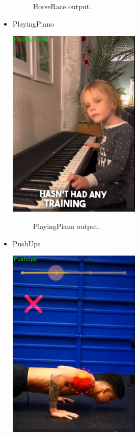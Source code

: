 \begin{itemize}
\begin{figure}[h!]
    	\caption[HorseRace output .]{HorseRace output.}
    	\label{race_lrcn.png} 
        \end{figure}

    \item PlayingPiano

        \includegraphics[width=0.5\textwidth]{Figures/piano_lrcn.png}
        \begin{figure}[h!]
    	\centering
    	
    	\caption[PlayingPiano output .]{PlayingPiano output.}
    	\label{piano_lrcn.png} 
        \end{figure}

    \item PushUps

        \includegraphics[width=0.5\textwidth]{Figures/pushup_lrcn.png}
        \begin{figure}[h!]
    	\centering
    	

\end{figure}
\end{itemize}

